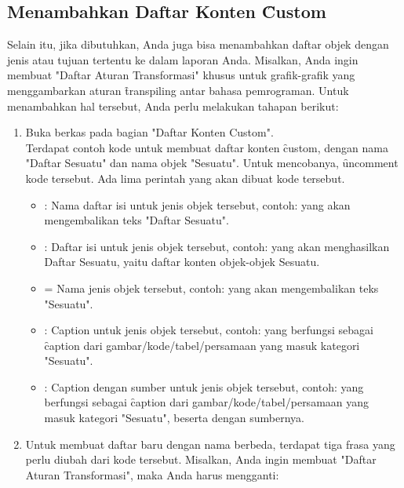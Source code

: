 \subsection{Menambahkan Daftar Konten \f{Custom}}
\label{sec:addCustomContentList}
Selain itu, jika dibutuhkan, Anda juga bisa menambahkan daftar objek dengan jenis atau tujuan tertentu ke dalam laporan Anda. Misalkan, Anda ingin membuat "Daftar Aturan Transformasi" khusus untuk grafik-grafik yang menggambarkan aturan \f{transpiling} antar bahasa pemrograman. Untuk menambahkan hal tersebut, Anda perlu melakukan tahapan berikut:

\begin{enumerate}
	\item Buka berkas  pada bagian "Daftar Konten Custom". \\
	Terdapat contoh kode untuk membuat daftar konten \f{custom}, dengan nama "Daftar Sesuatu" dan nama objek "Sesuatu". Untuk mencobanya, \f{uncomment} kode tersebut. Ada lima perintah yang akan dibuat kode tersebut.
	\begin{itemize}
		\item {}: Nama daftar isi untuk jenis objek tersebut, contoh:  yang akan mengembalikan teks "Daftar Sesuatu".
		\item {}: Daftar isi untuk jenis objek tersebut, contoh:  yang akan menghasilkan Daftar Sesuatu, yaitu daftar konten objek-objek Sesuatu.
		\item {} = Nama jenis objek tersebut, contoh:  yang akan mengembalikan teks "Sesuatu".
		\item {}: Caption untuk jenis objek tersebut, contoh:  yang berfungsi sebagai \f{caption} dari gambar/kode/tabel/persamaan yang masuk kategori "Sesuatu".
		\item {}: Caption dengan sumber untuk jenis objek tersebut, contoh:  yang berfungsi sebagai \f{caption} dari gambar/kode/tabel/persamaan yang masuk kategori "Sesuatu", beserta dengan sumbernya.
	\end{itemize}
	\item Untuk membuat daftar baru dengan nama berbeda, terdapat tiga frasa yang perlu diubah dari kode tersebut. Misalkan, Anda ingin membuat "Daftar Aturan Transformasi", maka Anda harus mengganti:

\end{enumerate}
